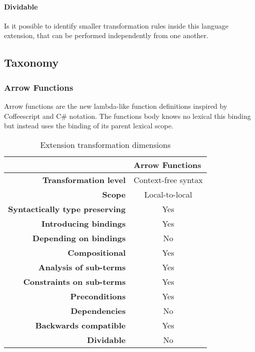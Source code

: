 \documentclass[10pt,a4paper]{article}
\begin{document}
\paragraph{Dividable}
Is it possible to identify smaller transformation rules inside this language extension, that can be performed independently from one another.

\subsection{Taxonomy}

\subsubsection{Arrow Functions}
Arrow functions\cite[14.2]{SpecJS} are the new lambda-like function definitions inspired by Coffeescript and C\# notation. The functions body knows no lexical this binding but instead uses the binding of its parent lexical scope.

\begin{table}[h]
\centering
\caption{Extension transformation dimensions}
\label{arrow-function-table}
\begin{tabular}{@{}rc@{}}
\toprule
                                       & \multicolumn{1}{l}{\textbf{Arrow Functions}} \\ \midrule
\textbf{Transformation level}          & Context-free syntax                          \\
\textbf{Scope}                         & Local-to-local                               \\
\textbf{Syntactically type preserving} & Yes                                          \\
\textbf{Introducing bindings}          & Yes                                          \\%
\textbf{Depending on bindings}         & No                                           \\
\textbf{Compositional}                 & Yes                                          \\
\textbf{Analysis of sub-terms}          & Yes                                          \\
\textbf{Constraints on sub-terms}       & Yes                                           \\
\textbf{Preconditions}                 & Yes                                          \\
\textbf{Dependencies}                  & No                                           \\
\textbf{Backwards compatible}          & Yes                                          \\
\textbf{Dividable}                     & No                                           \\ \bottomrule
\end{tabular}
\end{table}
\end{document}
